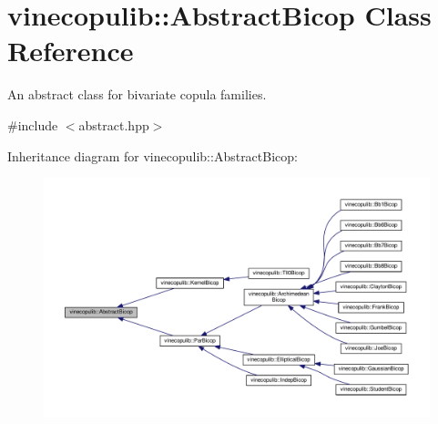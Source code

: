 \hypertarget{classvinecopulib_1_1_abstract_bicop}{}\section{vinecopulib\+:\+:Abstract\+Bicop Class Reference}
\label{classvinecopulib_1_1_abstract_bicop}


An abstract class for bivariate copula families.  




{\ttfamily \#include $<$abstract.\+hpp$>$}



Inheritance diagram for vinecopulib\+:\+:Abstract\+Bicop\+:
\nopagebreak
\begin{figure}[H]
\begin{center}
\leavevmode
\includegraphics[width=350pt]{classvinecopulib_1_1_abstract_bicop__inherit__graph}
\end{center}
\end{figure}
